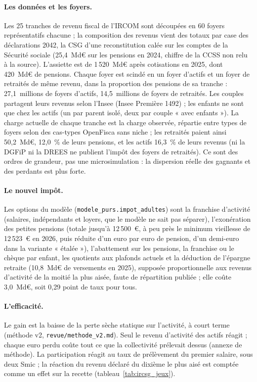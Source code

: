 \documentclass[11pt,a4paper]{article}
\begin{document}
\paragraph{Les données et les foyers.} Les 25 tranches de revenu fiscal de l'IRCOM sont découpées en 60 foyers
représentatifs chacune ; la composition des revenus vient des totaux par case des déclarations 2042, la CSG d'une
reconstitution calée sur les comptes de la Sécurité sociale (25,4~Md€ sur les pensions en 2024, chiffre de la CCSS non
relu à la source). L'assiette est de 1\,520~Md€ après cotisations en 2025, dont 420~Md€ de pensions. Chaque foyer est
scindé en un foyer d'actifs et un foyer de retraités de même revenu, dans la proportion des pensions de sa tranche :
27,1~millions de foyers d'actifs, 14,5~millions de foyers de retraités. Les couples partagent leurs revenus selon
l'Insee (Insee Première 1492) ; les enfants ne sont que chez les actifs (un par parent isolé, deux par couple « avec
enfants »). La charge actuelle de chaque tranche est la charge observée, répartie entre types de foyers selon des
cas-types OpenFisca sans niche ; les retraités paient ainsi 50,2~Md€, 12,0~\% de leurs pensions, et les actifs 16,3~\%
de leurs revenus (ni la DGFiP ni la DREES ne publient l'impôt des foyers de retraités). Ce sont des ordres de grandeur,
pas une microsimulation : la dispersion réelle des gagnants et des perdants est plus forte.

\paragraph{Le nouvel impôt.} Les options du modèle (\texttt{modele\_purs.impot\_adultes}) sont la franchise d'activité
(salaires, indépendants et loyers, que le modèle ne sait pas séparer), l'exonération des petites pensions (totale
jusqu'à 12\,500~€, à peu près le minimum vieillesse de 12\,523~€ en 2026, puis réduite d'un euro par euro de pension,
d'un demi-euro dans la variante « étalée »), l'abattement sur les pensions, la franchise ou le chèque par enfant, les
quotients aux plafonds actuels et la déduction de l'épargne retraite (10,8~Md€ de versements en 2025), supposée
proportionnelle aux revenus d'activité de la moitié la plus aisée, faute de répartition publiée ; elle coûte 3,0~Md€,
soit 0,29 point de taux pour tous.

\paragraph{L'efficacité.} Le gain est la baisse de la perte sèche statique sur l'activité, à court terme (méthode v2,
\texttt{revue/methode\_v2.md}). Seul le revenu d'activité des actifs réagit ; chaque euro perdu coûte tout ce que la
collectivité prélevait dessus (annexe de méthode). La participation réagit au taux de prélèvement du premier salaire,
sous deux Smic ; la réaction du revenu déclaré du dixième le plus aisé est comptée comme un effet sur la recette
(tableau~\ref{tab:ircsg_jeux}).
\end{document}
